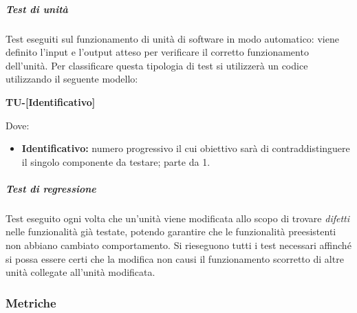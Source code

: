                     \subparagraph*{Test di unità}
                            Test eseguiti sul funzionamento di unità di software in modo automatico: viene definito l'input e l'output atteso per verificare il corretto funzionamento dell'unità.
                            Per classificare questa tipologia di test si utilizzerà un codice utilizzando il seguente modello:     

                            \begin{center}
                            	\textbf{TU-[Identificativo]}
                            \end{center}
                            Dove:
                            
							\begin{itemize}
                            	\item \textbf{Identificativo:} numero progressivo il cui obiettivo sarà di contraddistinguere il singolo componente da testare; parte da 1.
							\end{itemize}
						
                    \subparagraph*{Test di regressione}
        				Test eseguito ogni volta che un'unità viene modificata allo scopo di trovare \textit{difetti} nelle funzionalità già testate, potendo garantire che le funzionalità preesistenti non abbiano cambiato comportamento. Si rieseguono tutti i test necessari affinché si possa essere certi che la modifica non causi il funzionamento scorretto di altre unità collegate all'unità modificata.


                \subsubsection{Metriche}




